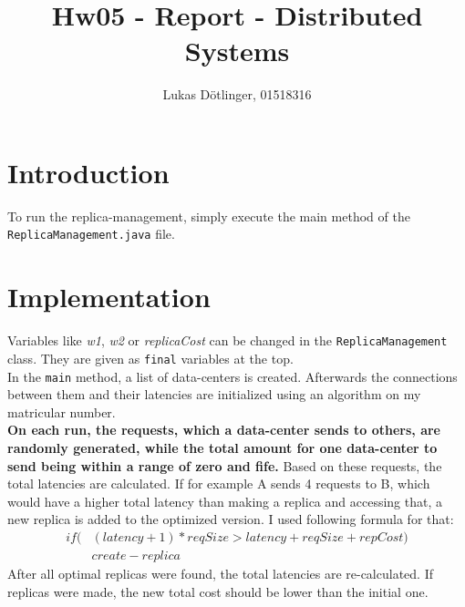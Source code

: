 \documentclass{article}
\begin{document}
  \title{Hw05 - Report - Distributed Systems}
  \date{}
  \author{Lukas Dötlinger, 01518316}
	
  \maketitle
  
  \section*{Introduction}
  
  	To run the replica-management, simply execute the main method of the\\ \texttt{ReplicaManagement.java} file.\\
  	
  \section*{Implementation}
  
    Variables like \textit{w1}, \textit{w2} or \textit{replicaCost} can be changed in the \texttt{ReplicaManagement} class. They are given as \texttt{final} variables at the top.\\
    In the \texttt{main} method, a list of data-centers is created. Afterwards the connections between them and their latencies are initialized using an algorithm on my matricular number.\\
    \textbf{On each run, the requests, which a data-center sends to others, are randomly generated, while the total amount for one data-center to send being within a range of zero and fife.} Based on these requests, the total latencies are calculated. If for example A sends 4 requests to B, which would have a higher total latency than making a replica and accessing that, a new replica is added to the optimized version. I used following formula for that:
    \begin{equation}
      \begin{split}
        if ( & (latency+1) * reqSize > latency + reqSize + repCost) \\
        & create-replica
      \end{split}
    \end{equation}
    After all optimal replicas were found, the total latencies are re-calculated. If replicas were made, the new total cost should be lower than the initial one.
  
\end{document}
